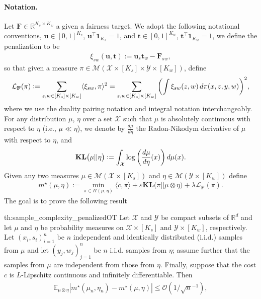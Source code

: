 \documentclass{article}
\newcommand{\kl}{\mathbf{KL}}
\theoremstyle{definition}
\begin{document}
\paragraph{Notation.}
Let $\mathbf{F} \in \mathbb{R}^{K_s \times K_w}$ a given a fairness target.
We adopt the following notational conventions, $\mathbf{u}\in [0, 1]^{K_s}$, $\mathbf{u}^\top\mathbf{1}_{K_s}=1$, and $\mathbf{t}\in [0, 1]^{K_w}$, $\mathbf{t}^\top\mathbf{1}_{K_w}=1$, we define the penalization to be
\begin{align}\label{eq:def_xi}
    \xi_{sw}(\mathbf{u},\mathbf{t}) 
    := \mathbf{u}_s \mathbf{t}_w - \mathbf{F}_{sw},
\end{align}
so that given a measure $\pi\in \mathcal{M}(\mathcal{X}\times [K_s] \times \mathcal{Y}\times [K_w])$, define
\begin{equation*}
    \mathcal{L}_\mathbf{F}(\pi) 
    \vcentcolon= \sum_{s,w\in [K_s] \times [K_w]} \langle \xi_{sw}, \pi\rangle^2 = \sum_{s,w\in [K_s] \times [K_w]} {\left( \int \xi_{sw}(z,w)\, d\pi(x,z,y,w) \right)}^2,
\end{equation*}
where we use the duality pairing notation and integral notation interchangeably.
For any distribution $\mu$, $\eta$ over a set $\mathcal{X}$ such that $\mu$ is absolutely continuous with respect to $\eta$ (i.e., $\mu \ll \eta$), we denote by $\frac{d\mu}{d\eta}$ the Radon-Nikodym derivative of $\mu$ with respect to $\eta$, and
\begin{equation*}
    \kl\big(\mu||\eta\big) \vcentcolon= \int_{\mathcal{X}} \log \left( \frac{d\mu}{d\eta}(x) \right)d\mu(x).
\end{equation*}
Given any two measures $\mu\in \mathcal{M}
(\mathcal{X}
\times [K_s])$ and $\eta\in \mathcal{M}
(\mathcal{Y}
\times [K_w])$ define
\begin{align}
    m^\star(\mu,\eta):=\min_{\pi \in \Pi(\mu, \eta)} \langle c, \pi \rangle + \varepsilon\kl\big(\pi||\mu\otimes\eta\big)+ \lambda\mathcal{L}_\mathbf{F}(\pi).
\end{align}
The goal is to prove the following result
\begin{reptheorem}{th:sample_complexity_penalizedOT}
 Let $\mathcal{X}$ and $\mathcal{Y}$ be compact subsets of $\mathbb{R}^d$ and let $\mu$ and $\eta$ be probability measures on $\mathcal{X}\times [K_s]$ and $\mathcal{Y}\times [K_w]$, respectively. Let $(x_i,s_i)_{i=1}^n$ be $n$ independent and identically distributed (i.i.d.) samples from $\mu$ and let $(y_j,w_j)_{j=1}^n$ be $n$ i.i.d. samples from $\eta$; assume further that the samples from $\mu$ are independent from those from $\eta$. Finally, suppose  that the cost $c$ is $L$-Lipschitz continuous and infinitely differentiable. Then
\begin{align}\label{eq:Goal}
    \mathbb{E}_{\mu\otimes \eta}|m^\star(\mu_n,\eta_n)-m^\star(\mu,\eta)|\leq \mathcal{O}(1/\sqrt{n}^{-1}),
\end{align}
\end{reptheorem}
\end{document}

